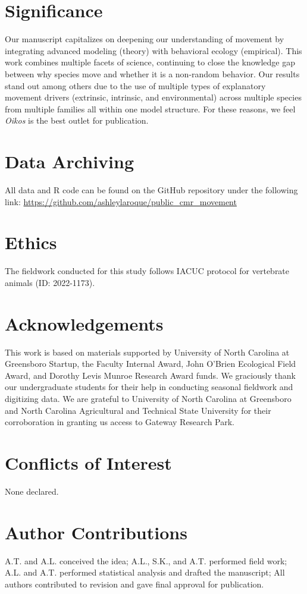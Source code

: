 \documentclass[11pt, class=article, crop=false]{standalone}
\date{}
\title{}
\begin{document}
\section*{Significance} %

Our manuscript capitalizes on deepening our understanding of movement by integrating advanced modeling (theory) with behavioral ecology (empirical). This work combines multiple facets of science, continuing to close the knowledge gap between why species move and whether it is a non-random behavior. Our results stand out among others due to the use of multiple types of explanatory movement drivers (extrinsic, intrinsic, and environmental) across multiple species from multiple families all within one model structure. For these reasons, we feel \textit{Oikos} is the best outlet for publication. 

\section*{Data Archiving}

All data and R code can be found on the GitHub repository under the following link: \url{https://github.com/ashleylaroque/public_cmr_movement}

\section*{Ethics}

The fieldwork conducted for this study follows IACUC protocol for vertebrate animals (ID: 2022-1173).

\section*{Acknowledgements}

This work is based on materials supported by University of North Carolina at Greensboro Startup, the Faculty Internal Award, John O'Brien Ecological Field Award, and Dorothy Levis Munroe Research Award funds. We graciously thank our undergraduate students for their help in conducting seasonal fieldwork and digitizing data. We are grateful to University of North Carolina at Greensboro and North Carolina Agricultural and Technical State University for their corroboration in granting us access to Gateway Research Park. 

\section*{Conflicts of Interest}

None declared.

\section*{Author Contributions}

A.T. and A.L. conceived the idea; A.L., S.K., and A.T. performed  field work; A.L. and A.T. performed statistical analysis and drafted the manuscript; All authors contributed to revision and gave final approval for  publication.
\end{document}
